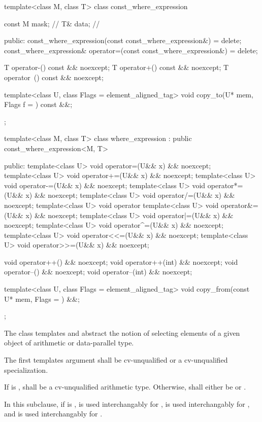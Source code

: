 \begin{codeblock}
template<class M, class T> class const_where_expression {
  const M mask;    // \expos
  T& data;         // \expos

public:
  const_where_expression(const const_where_expression&) = delete;
  const_where_expression& operator=(const const_where_expression&) = delete;

  T operator-() const && noexcept;
  T operator+() const && noexcept;
  T operator~() const && noexcept;

  template<class U, class Flags = element_aligned_tag> void copy_to(U* mem, Flags f = {}) const &&;
};

template<class M, class T>
class where_expression : public const_where_expression<M, T> {
public:
  template<class U> void operator=(U&& x) && noexcept;
  template<class U> void operator+=(U&& x) && noexcept;
  template<class U> void operator-=(U&& x) && noexcept;
  template<class U> void operator*=(U&& x) && noexcept;
  template<class U> void operator/=(U&& x) && noexcept;
  template<class U> void operator%
  template<class U> void operator&=(U&& x) && noexcept;
  template<class U> void operator|=(U&& x) && noexcept;
  template<class U> void operator^=(U&& x) && noexcept;
  template<class U> void operator<<=(U&& x) && noexcept;
  template<class U> void operator>>=(U&& x) && noexcept;

  void operator++() && noexcept;
  void operator++(int) && noexcept;
  void operator--() && noexcept;
  void operator--(int) && noexcept;

  template<class U, class Flags = element_aligned_tag> void copy_from(const U* mem, Flags = {}) &&;
};
\end{codeblock}

\pnum
The class templates  and  abstract the notion of selecting elements of a given object of arithmetic or data-parallel type.

\pnum
The first templates argument  shall be cv-unqualified  or a cv-unqualified  specialization.

\pnum
If  is ,  shall be a cv-unqualified arithmetic type. Otherwise,  shall either be  or .

\pnum
In this subclause, if  is ,  is used interchangably for ,  is used interchangably for , and  is used interchangably for .

